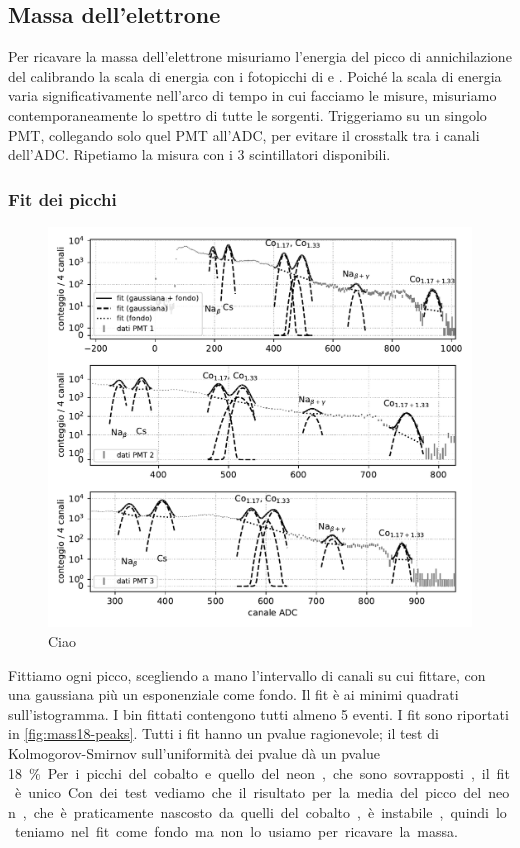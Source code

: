 \subsection{Massa dell'elettrone}

Per ricavare la massa dell'elettrone misuriamo l'energia del picco di annichilazione del \na{}
calibrando la scala di energia con i fotopicchi di \co{} e \cs{}.
Poiché la scala di energia varia significativamente nell'arco di tempo in cui facciamo le misure,
misuriamo contemporaneamente lo spettro di tutte le sorgenti.
Triggeriamo su un singolo PMT,
collegando solo quel PMT all'ADC, per evitare il crosstalk tra i canali dell'ADC.
Ripetiamo la misura con i 3 scintillatori disponibili.

\subsubsection{Fit dei picchi}

\begin{figure}
	\includegraphics[width=\textwidth]{immagini/mass18-peaks}
	\caption{\label{fig:mass18-peaks}
	Ciao}
\end{figure}

Fittiamo ogni picco, scegliendo a mano l'intervallo di canali su cui fittare,
con una gaussiana più un esponenziale come fondo.
Il fit è ai minimi quadrati sull'istogramma.
I bin fittati contengono tutti almeno 5 eventi.
I fit sono riportati in \autoref{fig:mass18-peaks}.
Tutti i fit hanno un pvalue ragionevole;
il test di Kolmogorov-Smirnov sull'uniformità dei pvalue dà un pvalue \SI{18}\%.
Per i picchi del cobalto e quello del neon, che sono sovrapposti, il fit è unico.
Con dei test vediamo che il risultato per la media del picco del neon,
che è praticamente nascosto da quelli del cobalto,
è instabile, quindi lo teniamo nel fit come fondo ma non lo usiamo per ricavare la massa.

